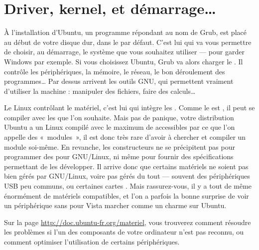 \section{Driver, kernel, et démarrage\ldots{}}
À l'installation d'Ubuntu, un programme répondant au nom de Grub, est placé au début de votre disque dur, dans le  par défaut. C'est lui qui va vous permettre de choisir, au démarrage, le système que vous souhaitez utiliser --- pour garder Windows par exemple. Si vous choisissez Ubuntu, Grub va alors charger le . Il contrôle les périphériques, la mémoire, le réseau, le bon déroulement des programmes\ldots{} Par dessus arrivent les outils GNU, qui permettent vraiment d'utiliser la machine : manipuler des fichiers, faire des calculs\ldots{} \par
Le  Linux contrôlant le matériel, c'est lui qui intègre les . Comme le  est , il peut se compiler avec les  que l'on souhaite. Mais pas de panique, votre distribution Ubuntu a un  Linux compilé avec le maximum de  accessibles par ce que l'on appelle des «~modules~», il est donc très rare d'avoir à chercher et compiler un module soi-même. En revanche, les constructeurs ne se précipitent pas pour programmer des  pour GNU/Linux, ni même pour fournir des spécifications permettant de les développer. Il arrive donc que certains matériels ne soient pas bien gérés par GNU/Linux, voire pas gérés du tout --- souvent des périphériques USB peu communs, ou certaines cartes . Mais rassurez-vous, il y a tout de même énormément de matériels compatibles, et l'on a parfois la bonne surprise de voir un périphérique sans  pour Vista marcher comme un charme sur Ubuntu.
\begin{nota}
Sur la page \url{http://doc.ubuntu-fr.org/materiel}, vous trouverez comment résoudre les problèmes si l'un des composants de votre ordinateur n'est pas reconnu, ou comment optimiser l'utilisation de certains périphériques.
\end{nota}
